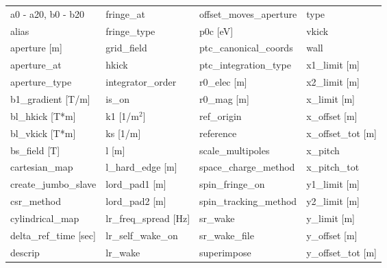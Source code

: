  \begin{tabular}{llll} \toprule
a0 - a20, b0 - b20             & fringe_at                      & offset_moves_aperture          & type                           \\
alias                          & fringe_type                    & p0c [eV]                       & vkick                          \\
aperture [m]                   & grid_field                     & ptc_canonical_coords           & wall                           \\
aperture_at                    & hkick                          & ptc_integration_type           & x1_limit [m]                   \\
aperture_type                  & integrator_order               & r0_elec [m]                    & x2_limit [m]                   \\
b1_gradient [T/m]              & is_on                          & r0_mag [m]                     & x_limit [m]                    \\
bl_hkick [T*m]                 & k1 [1/m$^2$]                   & ref_origin                     & x_offset [m]                   \\
bl_vkick [T*m]                 & ks [1/m]                       & reference                      & x_offset_tot [m]               \\
bs_field [T]                   & l [m]                          & scale_multipoles               & x_pitch                        \\
cartesian_map                  & l_hard_edge [m]                & space_charge_method            & x_pitch_tot                    \\
create_jumbo_slave             & lord_pad1 [m]                  & spin_fringe_on                 & y1_limit [m]                   \\
csr_method                     & lord_pad2 [m]                  & spin_tracking_method           & y2_limit [m]                   \\
cylindrical_map                & lr_freq_spread [Hz]            & sr_wake                        & y_limit [m]                    \\
delta_ref_time [sec]           & lr_self_wake_on                & sr_wake_file                   & y_offset [m]                   \\
descrip                        & lr_wake                        & superimpose                    & y_offset_tot [m]               \\

\end{tabular}
